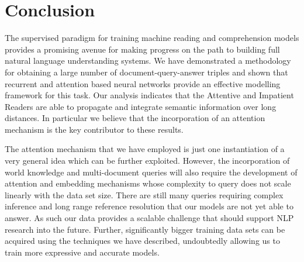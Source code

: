 \section{Conclusion}
\label{conclusions}
The supervised paradigm for training machine reading and comprehension models
provides a promising avenue for making progress on the path to building full
natural language understanding systems. We have demonstrated a methodology for
obtaining a large number of document-query-answer triples and shown that
recurrent and attention based neural networks provide an effective modelling
framework for this task.
Our analysis indicates that the Attentive and Impatient Readers are able to
propagate and integrate semantic information over long distances. In particular
we believe that the incorporation of an attention mechanism is the key
contributor to these results.


The attention mechanism
that we have employed is just one instantiation of a very general idea which
can be further exploited. However, the incorporation of world knowledge and
multi-document queries will also require the development of attention and
embedding mechanisms whose complexity to query does not scale linearly with the
data set size.
There are still many queries requiring complex inference and long range reference resolution that our models are not yet able to answer. As such our data provides a scalable challenge that should support NLP research into the future. Further, significantly bigger training data sets can be acquired using the techniques we have described, undoubtedly allowing us to train more expressive and accurate models.
